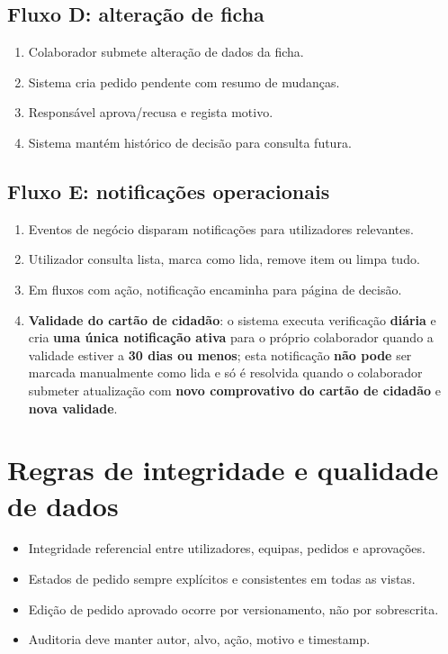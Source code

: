 \documentclass[11pt,a4paper]{article}
\begin{document}
\subsection{Fluxo D: alteração de ficha}
\begin{enumerate}
  \item Colaborador submete alteração de dados da ficha.
  \item Sistema cria pedido pendente com resumo de mudanças.
  \item Responsável aprova/recusa e regista motivo.
  \item Sistema mantém histórico de decisão para consulta futura.
\end{enumerate}

\subsection{Fluxo E: notificações operacionais}
\begin{enumerate}
  \item Eventos de negócio disparam notificações para utilizadores relevantes.
  \item Utilizador consulta lista, marca como lida, remove item ou limpa tudo.
  \item Em fluxos com ação, notificação encaminha para página de decisão.
  \item \textbf{Validade do cartão de cidadão}: o sistema executa verificação \textbf{diária} e cria \textbf{uma única notificação ativa} para o próprio colaborador quando a validade estiver a \textbf{30 dias ou menos}; esta notificação \textbf{não pode} ser marcada manualmente como lida e só é resolvida quando o colaborador submeter atualização com \textbf{novo comprovativo do cartão de cidadão} e \textbf{nova validade}.
\end{enumerate}

\section{Regras de integridade e qualidade de dados}
\begin{itemize}
  \item Integridade referencial entre utilizadores, equipas, pedidos e aprovações.
  \item Estados de pedido sempre explícitos e consistentes em todas as vistas.
  \item Edição de pedido aprovado ocorre por versionamento, não por sobrescrita.
  \item Auditoria deve manter autor, alvo, ação, motivo e timestamp.
\end{itemize}
\end{document}
